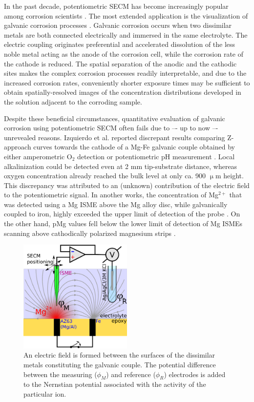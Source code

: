 \documentclass[3p]{elsarticle}
\begin{document}
In the past decade, potentiometric SECM has become increasingly popular among corrosion scientists \cite{lamaka, ZnISME, diamondel, cutedge, H+selective, simulating}.
The most extended application is the visualization of galvanic corrosion processes \cite{amperopot, chloride, spatiozn, fezn}.
Galvanic corrosion occurs when two dissimilar metals are both connected electrically and immersed in the same electrolyte. 
The electric coupling originates preferential and accelerated dissolution of the less noble metal acting as the anode of the corrosion cell, while the corrosion rate of the cathode is reduced.
The spatial separation of the anodic and the cathodic sites makes the complex corrosion processes readily interpretable, and due to the increased corrosion rates, conveniently shorter exposure times may be sufficient to obtain spatially-resolved images of the concentration distributions developed in the solution adjacent to the corroding sample.

Despite these beneficial circumstances, quantitative evaluation of galvanic corrosion using potentiometric SECM often fails due to –- up to now –- unrevealed reasons.
Izquierdo et al. reported discrepant results comparing Z-approach curves towards the cathode of a Mg-Fe galvanic couple obtained by either amperometric O$_2$ detection or potentiometric pH measurement \cite{pH15}. Local alkalinization could be detected even at 2 mm tip-substrate distance, whereas oxygen concentration already reached the bulk level at only ca. 900 $\upmu$m height. This discrepancy was attributed to an (unknown) contribution of the electric field to the potentiometric signal.  
In another works, the concentration of Mg$^{2+}$ that was detected using a Mg ISME above the Mg alloy disc, while galvanically coupled to iron, highly exceeded the upper limit of detection of the probe \cite{overmg1, overmg2, overmg3}.
On the other hand, pMg values fell below the lower limit of detection of Mg ISMEs scanning above cathodically polarized magnesium strips \cite{belowmg}. 

\begin{figure}
\centering
\includegraphics[width=0.5\textwidth]{abstract.eps}
\caption{An electric field is formed between the surfaces of the dissimilar metals constituting the galvanic couple. The potential difference between the measuring ($\phi_M$) and reference ($\phi_R$) electrodes is added to the Nernstian potential associated with the activity of the particular ion.}
\label{fig:abstract}
\end{figure}
\end{document}
